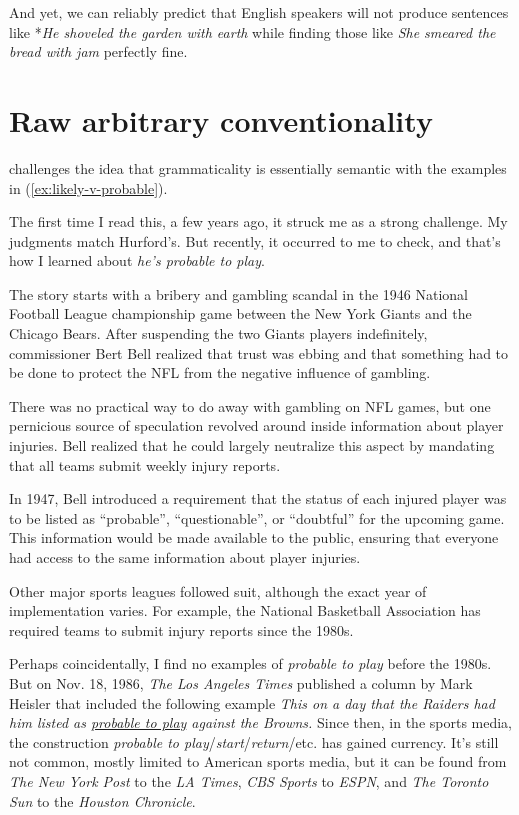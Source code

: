 And yet, we can reliably predict that English speakers will not produce sentences like *\textit{He shoveled the garden with earth} while finding those like \textit{She smeared the bread with jam} perfectly fine.

\section{Raw arbitrary conventionality}

\citet[231]{Hurford2012a} challenges the idea that grammaticality is essentially semantic with the examples in (\ref{ex:likely-v-probable}).

\ea \label{ex:likely-v-probable}
    \z
\z

The first time I read this, a few years ago, it struck me as a strong challenge. My judgments match Hurford's. But recently, it occurred to me to check, and that's how I learned about \textit{he's probable to play}.

\bigskip

The story starts with a bribery and gambling scandal in the 1946 National Football League championship game between the New York Giants and the Chicago Bears. After suspending the two Giants players indefinitely, commissioner Bert Bell realized that trust was ebbing and that something had to be done to protect the NFL from the negative influence of gambling.

There was no practical way to do away with gambling on NFL games, but one pernicious source of speculation revolved around inside information about player injuries. Bell realized that he could largely neutralize this aspect by mandating that all teams submit weekly injury reports.

In 1947, Bell introduced a requirement that the status of each injured player was to be listed as ``probable'', ``questionable'', or ``doubtful'' for the upcoming game. This information would be made available to the public, ensuring that everyone had access to the same information about player injuries.

Other major sports leagues followed suit, although the exact year of implementation varies. For example, the National Basketball Association has required teams to submit injury reports since the 1980s.

Perhaps coincidentally, I find no examples of \textit{probable to play} before the 1980s. But on Nov. 18, 1986, \textit{The Los Angeles Times} published a column by Mark Heisler that included the following example \textit{This on a day that the Raiders had him listed as \uline{probable to play} against the Browns.} Since then, in the sports media, the construction \textit{probable to play}/\textit{start}/\textit{return}/etc. has gained currency. It's still not common, mostly limited to American sports media, but it can be found from \textit{The New York Post} to the \textit{LA Times}, \textit{CBS Sports} to \textit{ESPN}, and \textit{The Toronto Sun} to the \textit{Houston Chronicle}.

